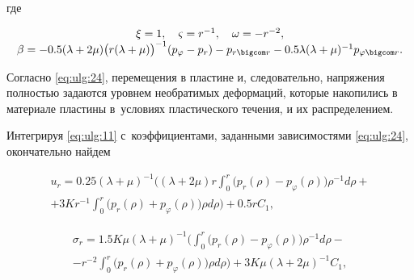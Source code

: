 где

\begin{equation} 

\label{eq:ulg:24} 

\begin{array}{c} 

\xi =1, \quad  \varsigma =r^{-1} ,  \quad  \omega =-r^{-2} , \\ 

\beta =-0.5 (\lambda +2\mu ) \bigl(r (\lambda +\mu )\bigr)^{-1} (p_{\varphi } -p_{r} )-p_{r\bigcom r} -0.5\lambda (\lambda +\mu )^{-1} p_{\varphi \bigcom r} .

\end{array} 

\end{equation} 

Согласно \eqref{eq:ulg:24}, перемещения в пластине и, следовательно, напряжения полностью задаются уровнем необратимых деформаций, которые накопились в материале пластины в~условиях пластического течения, и их распределением. 

Интегрируя \eqref{eq:ulg:11} с~коэффициентами, заданными зависимостями \eqref{eq:ulg:24}, окончательно найдем

\begin{multline} 

\label{eq:ulg:25} 

u_{r} =

0.25 (\lambda +\mu )^{-1} 

\biggl(

(\lambda +2\mu )r\int _{0}^{r} \bigl(p_{r} (\rho )-p_{\varphi } (\rho )\bigr) \rho ^{-1} d\rho  

+ 

\\ 



+

3Kr^{-1} \int _{0}^{r} \bigl(p_{r} (\rho )+p_{\varphi } (\rho )\bigr) \rho  d\rho  


\biggr)

+0.5rC_{1}, 

\end{multline}

\begin{multline}

\sigma _{r} =

1.5K\mu (\lambda +\mu )^{-1} 

\biggl(

\int _{0}^{r} \bigl(p_{r} (\rho )-p_{\varphi } (\rho )\bigr) \rho ^{-1}  d\rho -

\\

-r^{-2} \int _{0}^{r} \bigl(p_{r} (\rho )+p_{\varphi } (\rho )\bigr) \rho  d\rho  \biggr)

+ 3K\mu (\lambda +2\mu )^{-1} C_{1},

\end{multline}

